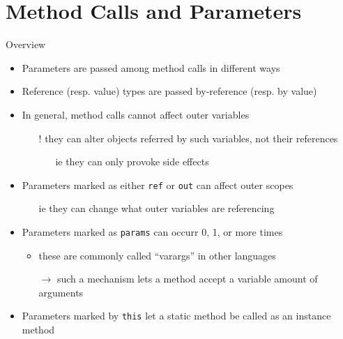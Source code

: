 \documentclass[presentation]{beamer}
\begin{document}
\section{Method Calls and Parameters}

\begin{frame}{Overview}
  \begin{itemize}
    \item Parameters are \alert{passed} among method calls in different ways
  
    \vfill

    \item Reference (resp. value) types are passed by-reference (resp. by value)
    
    \vfill
    
    \item In general, method calls cannot affect outer variables
    \begin{itemize}
      \item[!] they can alter objects referred by such variables, not their references
      \begin{itemize}
        \item[ie] they can only provoke \alert{side effects}
      \end{itemize}  
    \end{itemize}

    \vfill

    \item Parameters marked as either \texttt{ref} or \texttt{out} can affect outer scopes
    \begin{itemize}
      \item[ie] they can \alert{change} what outer variables are referencing
    \end{itemize}  

    \vfill

    \item Parameters marked as \texttt{params} can occurr 0, 1, or more times
    \begin{itemize}
      \item these are commonly called ``varargs'' in other languages
      \item[$\rightarrow$] such a mechanism lets a method accept a variable amount of arguments
    \end{itemize}

    \vfill

    \item Parameters marked by \texttt{this} let a static method be called as an instance method
  \end{itemize}
\end{frame}
\end{document}
